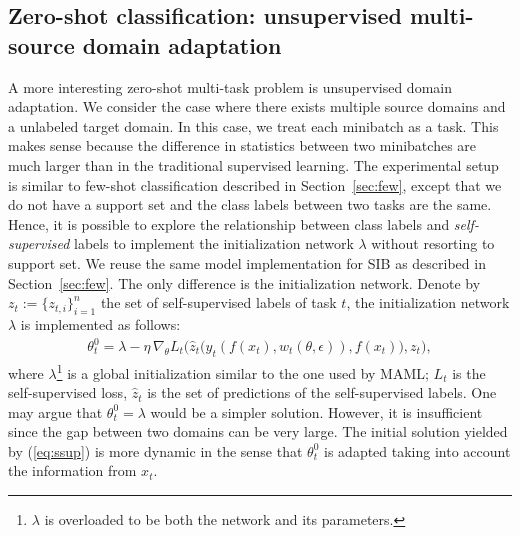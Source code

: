\documentclass{article} \usepackage{iclr2020_conference,times}
\def\eqref#1{(\ref{#1})}
\begin{document}
\subsection{Zero-shot classification: unsupervised multi-source domain adaptation}

\begin{table}[t]
\centering
\footnotesize
{}
\caption{Multi-source domain adaptation results on PACS with ResNet-18 features.
Three domains are used as the source domains keeping the fourth one as target.}
\label{tab:uda}
\end{table}


A more interesting zero-shot multi-task problem is unsupervised domain adaptation.
We consider the case where there exists multiple source domains and a unlabeled target domain.
In this case, we treat each minibatch as a task. This makes sense because the difference in statistics between two minibatches 
are much larger than in the traditional supervised learning.
The experimental setup is similar to few-shot classification described in Section~\ref{sec:few},
except that we do not have a support set and the class labels between two tasks are the same.
Hence, it is possible to explore the relationship between class labels and \emph{self-supervised} labels to implement 
the initialization network $\lambda$ without resorting to support set.
We reuse the same model implementation for SIB as described in Section~\ref{sec:few}. The only difference is the initialization network.
Denote by $z_t := \{ z_{t,i} \}_{i=1}^n$ the set of self-supervised labels of task $t$, 
the initialization network $\lambda$ is implemented as follows:
\begin{align}
    \label{eq:ssup}
    \theta_t^0 = \lambda - \eta \, \nabla_{\theta} L_t\Big( \hat{z}_t\big( \hat{y}_t(f(x_t), w_t(\theta, \epsilon)), f(x_t)\big), z_t \Big),
\end{align}
where $\lambda$\footnote{$\lambda$ is overloaded to be both the network and its parameters.} 
is a global initialization similar to the one used by MAML; 
$L_t$ is the self-supervised loss, $\hat{z}_t$ is the set of predictions of the self-supervised labels. 
One may argue that $\theta_t^0 = \lambda$ would be a simpler solution. 
However, it is insufficient since the gap between two domains can be very large.
The initial solution yielded by \eqref{eq:ssup} is more dynamic in the sense that 
$\theta_t^0$ is adapted taking into account the information from $x_t$.
\end{document}
